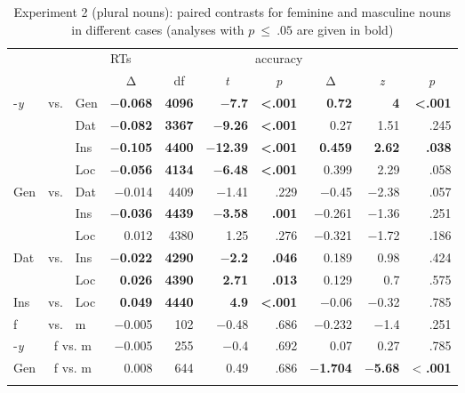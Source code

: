 \documentclass[output=paper, modfonts,newtxmath,hidelinks]{langscibook}
\begin{document}
\begin{table}
\centering
\caption{Experiment 2 (plural nouns): paired contrasts for feminine and masculine nouns in different cases (analyses with $p~\leq~.05$ are given in bold)}
\label{tab:casePlComparisons}
 \begin{tabular}{*{3}l*{7}r} 
  \lsptoprule
  	\multicolumn{3}{l}{}	&	\multicolumn{4}{c}{RTs}	&	\multicolumn{3}{c}{accuracy}\\
  	\cline{4-10}
 	\multicolumn{3}{l}{}	&	\multicolumn{1}{c}{Δ} 	& \multicolumn{1}{c}{df}	&   \multicolumn{1}{c}{\textit{t}}	&	\multicolumn{1}{c}{\textit{p}}	&	\multicolumn{1}{c}{Δ} & \multicolumn{1}{c}{\textit{z}}	& \multicolumn{1}{c}{\textit{p}}	\\
  \midrule
    -\textit{y}	&	vs.	&	Gen	&	\textbf{$-$0.068}	&	\textbf{4096}	& 	\textbf{$-$7.7}	&	\textbf{<.001}	& 	\textbf{0.72}	& 	\textbf{4}	& 	\textbf{<.001}	\\
	~&	~	&	Dat	&	\textbf{$-$0.082}	&	\textbf{3367}	& 	\textbf{$-$9.26}	&	\textbf{<.001}	& 		0.27		& 		1.51		& 		.245		\\
	~&	~	&	Ins	&	\textbf{$-$0.105}	&	\textbf{4400}	& 	\textbf{$-$12.39}	&	\textbf{<.001}	& 	\textbf{0.459}	& 	\textbf{2.62}	& 	\textbf{.038}	\\
	~&	~	&	Loc	&	\textbf{$-$0.056}	&	\textbf{4134}	& 	\textbf{$-$6.48}	&	\textbf{<.001}	& 	0.399	& 		2.29		& 		.058		\\
    Gen	&	vs.	&	Dat	&		$-$0.014		&		4409		& 		$-$1.41		&		.229		& 		$-$0.45		& 		$-$2.38		& 		.057	\\
	~&	~	&	Ins	&	\textbf{$-$0.036}	&	\textbf{4439}	& 	\textbf{$-$3.58}	&	\textbf{.001}	& 		$-$0.261		& 		$-$1.36		& 		.251		\\
	~&	~	&	Loc	&		0.012		&		4380		& 		1.25		&		.276		& 		$-$0.321		& 		$-$1.72		& 		.186	\\
    Dat	&	vs.	&	Ins	&	\textbf{$-$0.022}	&	\textbf{4290}	& 	\textbf{$-$2.2}	&	\textbf{.046}	& 		0.189		& 		0.98		& 		.424		\\
	~&	~	&	Loc	&	\textbf{0.026}	&	\textbf{4390}	& 	\textbf{2.71}	&	\textbf{.013}	& 		0.129		& 		0.7		& 		.575	\\
    Ins	&	vs.	&	Loc	&	\textbf{0.049}	&	\textbf{4440}	& 	\textbf{4.9}	&	\textbf{<.001}	& 		$-$0.06		& 		$-$0.32		& 		.785		\\
    \midrule
    f &	vs. & 	m &	$-$0.005 &	102	& $-$0.48	& .686 &	$-$0.232 &	$-$1.4 &	.251\\
    \midrule
    -\textit{y} & \multicolumn{2}{c}{f vs. m} & $-$0.005 &    255 & $-$0.4  & .692 &	0.07   &   0.27   & .785\\
    Gen &  \multicolumn{2}{c}{f vs. m}   &   0.008   &   644 &   0.49    & .686  &  \textbf{ $-$1.704 } &   \textbf{$-$5.68}  & < \textbf{.001}\\

  \lspbottomrule	
 \end{tabular}
\end{table}
\end{document}
